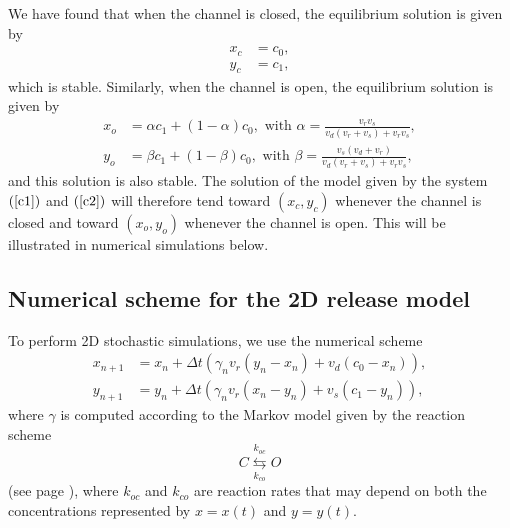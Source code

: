 We have found that when the channel is closed, the equilibrium solution is given
by
\begin{align*}
x_{c} &  =c_{0},\\
y_{c} &  =c_{1},
\end{align*}
which is stable. Similarly, when the channel is open, the equilibrium solution 
is given by%
\begin{align*}
x_{o} &  =\alpha c_{1}+\left(  1-\alpha\right)  c_{0},\text{ with }%
\alpha=\frac{v_{r}v_{s}}{v_{d}\left(  v_{r}+v_{s}\right)  +v_{r}v_{s}},\\
y_{o} &  =\beta c_{1}+\left(  1-\beta\right)  c_{0},\text{ with }\beta
=\frac{v_{s}\left(  v_{d}+v_{r}\right)  }{v_{d}\left(  v_{r}+v_{s}\right)
+v_{r}v_{s}},%
\end{align*}
and this solution is also stable. The solution of the model given by the system $\left(
\ref{c1}\right)$ and $\left(\ref{c2}\right)  $ will therefore tend toward $(x_{c},y_{c})$
whenever the channel is closed and toward  $(x_{o},y_{o})$ whenever the
channel is open. This will be illustrated in numerical simulations below.


\subsection{Numerical scheme for the 2D release model}

To perform 2D stochastic simulations, we use the numerical scheme
\begin{align}
x_{n+1}  &  =x_{n}+\Delta t\left(  \gamma_{n}v_{r}\left(  y_{n}-x_{n}\right)
+v_{d}\left(  c_{0}-x_{n}\right)  \right)  ,\label{nc1}\\
y_{n+1}  &  =y_{n}+\Delta t\left(  \gamma_{n}v_{r}\left(  x_{n}-y_{n}\right)
+v_{s}\left(  c_{1}-y_{n}\right)  \right)  , \label{nc2}%
\end{align}
where $\gamma$ is computed according to the Markov model given by the reaction scheme
\begin{equation}
C\underset{k_{co}}{\overset{k_{oc}}{\leftrightarrows}}O \label{Markov2}%
\end{equation}
(see page \pageref{numscheme}),
where $k_{oc}$ and $k_{co}$ are reaction rates that may depend on both the concentrations
represented by $x=x(t)$ and $y=y(t)$.

